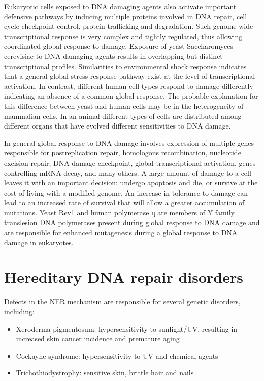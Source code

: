 Eukaryotic cells exposed to DNA damaging agents also activate important defensive pathways by inducing multiple proteins involved in DNA repair, cell cycle checkpoint control, protein trafficking and degradation. Such genome wide transcriptional response is very complex and tightly regulated, thus allowing coordinated global response to damage. Exposure of yeast Saccharomyces cerevisiae to DNA damaging agents results in overlapping but distinct transcriptional profiles. Similarities to environmental shock response indicates that a general global stress response pathway exist at the level of transcriptional activation. In contrast, different human cell types respond to damage differently indicating an absence of a common global response. The probable explanation for this difference between yeast and human cells may be in the heterogeneity of mammalian cells. In an animal different types of cells are distributed among different organs that have evolved different sensitivities to DNA damage.

In general global response to DNA damage involves expression of multiple genes responsible for postreplication repair, homologous recombination, nucleotide excision repair, DNA damage checkpoint, global transcriptional activation, genes controlling mRNA decay, and many others. A large amount of damage to a cell leaves it with an important decision: undergo apoptosis and die, or survive at the cost of living with a modified genome. An increase in tolerance to damage can lead to an increased rate of survival that will allow a greater accumulation of mutations. Yeast Rev1 and human polymerase η are members of Y family translesion DNA polymerases present during global response to DNA damage and are responsible for enhanced mutagenesis during a global response to DNA damage in eukaryotes.

\hypertarget{hereditary-dna-repair-disorders}{%
\section{Hereditary DNA repair disorders}\label{hereditary-dna-repair-disorders}}

Defects in the NER mechanism are responsible for several genetic disorders, including:

\begin{itemize}
\tightlist
\item
  Xeroderma pigmentosum: hypersensitivity to sunlight/UV, resulting in increased skin cancer incidence and premature aging
\item
  Cockayne syndrome: hypersensitivity to UV and chemical agents
\item
  Trichothiodystrophy: sensitive skin, brittle hair and nails
\end{itemize}

